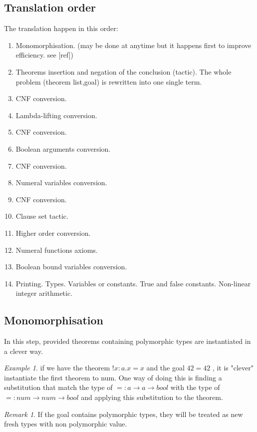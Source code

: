 \documentclass[a4paper, 11pt]{article}
\theoremstyle{plain}
\theoremstyle{definition}
\theoremstyle{remark}
\newtheorem*{remark}{Remark}
\newtheorem*{example}{Example}
\begin{document}
\subsection{Translation order}
The translation happen in this order: 
\begin{enumerate}    
  \item Monomorphisation. (may be done at anytime but it happens first to improve efficiency. see [ref])
  \item Theorems insertion and negation of the conclusion (tactic).
The whole problem (theorem list,goal) is rewritten into one single term.     
  \item CNF conversion.
  \item Lambda-lifting conversion.
  \item CNF conversion. 
  \item Boolean arguments conversion. 
  \item CNF conversion.
  \item Numeral variables conversion.
  \item CNF conversion.  
  \item Clause set tactic.  
  \item Higher order conversion.
  \item Numeral functions axioms.   
  \item Boolean bound variables conversion.   
  \item Printing.
    \subitem Types.
    \subitem Variables or constants.      
    \subitem True and false constants.  
    \subitem Non-linear integer arithmetic.
\end{enumerate}  
  
\subsection{Monomorphisation}
  In this step, provided theorems containing polymorphic types are instantiated in a clever way.
  
\begin{example} if we have the theorem $!x:a. x = x$ 
and the goal $42 = 42$ , it is "clever" instantiate the first theorem to num. One way of doing this is finding a substitution that match the type of $= : a \rightarrow a \rightarrow bool$ with the type of $= : num \rightarrow num \rightarrow bool$ and applying this substitution to the theorem.
\end{example}
 
\begin{remark}
If the goal contains polymorphic types, they will be treated as new fresh types with non polymorphic value.
\end{remark} 
  
\end{document}
